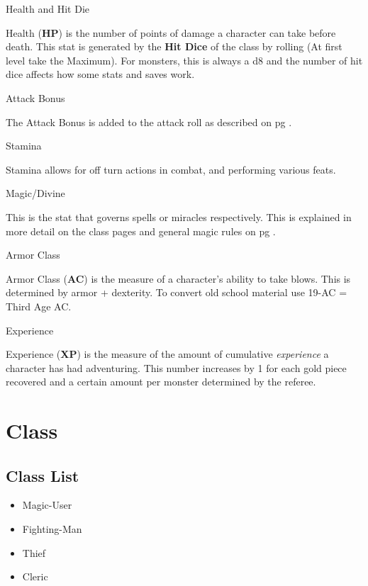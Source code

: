 \begin{multicols}{2}
\begin{mercHeading}
Health and Hit Die
\end{mercHeading}
Health (\textbf{HP}) is the number of points of damage a character can take before death. This stat is generated by the \textbf{Hit Dice} of the class by rolling (At first level take the Maximum). For monsters, this is always a d8 and the number of hit dice affects how some stats and saves work.

\begin{mercHeading}
Attack Bonus
\end{mercHeading}
The Attack Bonus is added to the attack roll as described on pg \pageref{label:atkroll}.

\begin{mercHeading}
Stamina
\end{mercHeading}
Stamina allows for off turn actions in combat, and performing various feats.

\begin{mercHeading}
Magic/Divine
\end{mercHeading}
This is the stat that governs spells or miracles respectively. This is explained in more detail on the class pages and general magic rules on pg \pageref{section:GenMagicRules}.

\begin{mercHeading}
Armor Class
\end{mercHeading}
Armor Class (\textbf{AC}) is the measure of a character's ability to take blows. This is determined by armor + dexterity. To convert old school material use 19-AC = Third Age AC.

\begin{mercHeading}
Experience
\end{mercHeading}
Experience (\textbf{XP}) is the measure of the amount of cumulative \emph{experience} a character has had adventuring. This number increases by 1 for each gold piece recovered and a certain amount per monster determined by the referee.
\section*{Class}
\subsection*{Class List}
\label{label:Class}
\begin{itemize}
	\item Magic-User
	\item Fighting-Man
	\item Thief
	\item Cleric
\end{itemize}

\end{multicols}